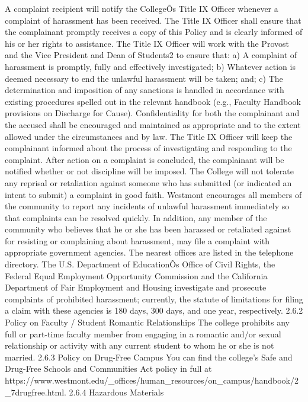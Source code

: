 \documentclass[letterpaper, 11pt]{article}
\begin{document}
   A complaint recipient will notify the CollegeÕs Title IX Officer whenever a complaint of harassment has been received.  The Title IX Officer shall ensure that the complainant promptly receives a copy of this Policy and is clearly informed of his or her rights to assistance.
   The Title IX Officer will work with the Provost and the Vice President and Dean of Students2 to ensure that:
a) A complaint of harassment is promptly, fully and effectively investigated;
b) Whatever action is deemed necessary to end the unlawful harassment will be taken; and;
c) The determination and imposition of any sanctions is handled in accordance with existing procedures spelled out in the relevant handbook (e.g., Faculty Handbook provisions on Discharge for Cause).
   Confidentiality for both the complainant and the accused shall be encouraged and maintained as appropriate and to the extent allowed under the circumstances and by law.
   The Title IX Officer will keep the complainant informed about the process of investigating and responding to the complaint.  After action on a complaint is concluded, the complainant will be notified whether or not discipline will be imposed.  The College will not tolerate any reprisal or retaliation against someone who has submitted (or indicated an intent to submit) a complaint in good faith.
   Westmont encourages all members of the community to report any incidents of unlawful harassment immediately so that complaints can be resolved quickly.  In addition, any member of the community who believes that he or she has been harassed or retaliated against for resisting or complaining about harassment, may file a complaint with appropriate government agencies.  The nearest offices are listed in the telephone directory. The U.S. Department of EducationÕs Office of Civil Rights, the Federal Equal Employment Opportunity Commission and the California Department of Fair Employment and Housing investigate and prosecute complaints of prohibited harassment; currently, the statute of limitations for filing a claim with these agencies is 180 days, 300 days, and one year, respectively.
2.6.2 Policy on Faculty / Student Romantic Relationships
The college prohibits any full or part-time faculty member from engaging in a romantic and/or sexual relationship or activity with any current student to whom he or she is not married.
2.6.3 Policy on Drug-Free Campus
   You can find the college's Safe and Drug-Free Schools and Communities Act policy in full at https://www.westmont.edu/_offices/human_resources/on_campus/handbook/2_7drugfree.html.
2.6.4 Hazardous Materials
\end{document}
